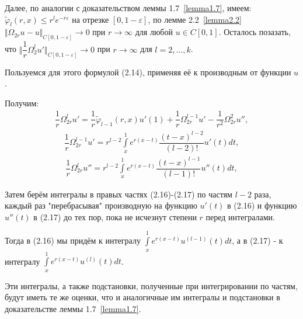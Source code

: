 Далее, по аналогии с доказательством леммы 1.7~\eqref{lemma1.7}, имеем: $ \widetilde\varphi_l(r,x) \leq r^le^{-r\varepsilon} $ на отрезке $ [0,1-\varepsilon] $, по лемме 2.2~\eqref{lemma2.2} $ \Vert \Omega_{2r}u - u \Vert_{C[0,1-\varepsilon]} \rightarrow 0 $ при $ r \rightarrow \infty $ для любой $ u \in C[0,1] $. Осталось позазать, что $ \biggl\Vert \dfrac{1}{r}\Omega_2^lu' \biggr\Vert_{C[0,1-\varepsilon]} \rightarrow 0 $ при $ r \rightarrow \infty $ для $ l = 2,...,k $.

Пользуемся для этого формулой (2.14), применяя её к производным от функции $ u $.

Получим:
\begin{equation}
\begin{array}{c}
\nonumber

\dfrac{1}{r}\Omega_{2r}^lu' = \dfrac{1}{r} \widetilde\varphi_{l-1}(r,x)u'(1) + \dfrac{1}{r}\Omega_{2r}^{l-1}u' - \dfrac{1}{r^2}\Omega_{2r}^2u'',

\end{array}
\end{equation}
\begin{equation}
\begin{array}{c}

\dfrac{1}{r}\Omega_{2r}^{l-1}u' = r^{l-2}\int\limits_x^1 e^{r(x-t)}\dfrac{(t-x)^{l-2}}{(l-2)!}u'(t)dt,

\end{array}
\end{equation}
\begin{equation}
\begin{array}{c}

\dfrac{1}{r}\Omega_{2r}^lu'' = r^{l-2}\int\limits_x^1 e^{r(x-t)}\dfrac{(t-x)^{l-1}}{(l-1)!}u''(t)dt,

\end{array}
\end{equation}

Затем берём интегралы в правых частях (2.16)-(2.17) по частям $ l - 2 $ раза, каждый раз "перебрасывая" производную на функцию $ u'(t) $ в (2.16) и функцию $ u''(t) $ в (2.17) до тех пор, пока не исчезнут степени $ r $ перед интегралами.

Тогда в (2.16) мы придём к интегралу $ \int\limits_x^1 e^{r(x-t)}u^{(l-1)}(t)dt $, а в (2.17) - к интегралу $ \int\limits_x^1 e^{r(x-t)}u^{(l)}(t)dt $.

Эти интегралы, а также подстановки, полученные при интегрировании по частям, будут иметь те же оценки, что и аналогичные им интегралы и подстановки в доказательстве леммы 1.7~\eqref{lemma1.7}.

